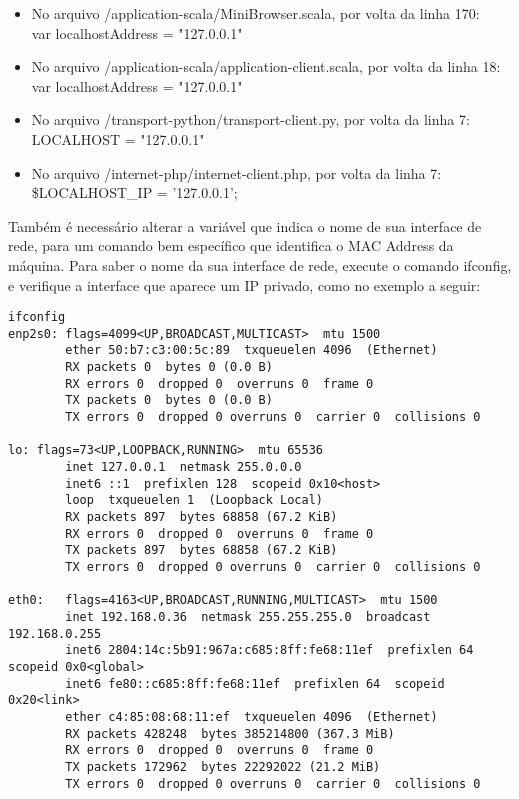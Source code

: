 \documentclass[11pt]{article}
\begin{document}
        \begin{itemize}
            \item No arquivo /application-scala/MiniBrowser.scala, por volta da linha 170: \\ 
                    var localhostAddress = "127.0.0.1"
            \item No arquivo /application-scala/application-client.scala, por volta da linha 18: \\
                    var localhostAddress = "127.0.0.1"
            \item No arquivo /transport-python/transport-client.py, por volta da linha 7: \\
                    LOCALHOST = "127.0.0.1"
            \item No arquivo /internet-php/internet-client.php, por volta da linha 7: \\
                    \$LOCALHOST\_IP = '127.0.0.1';
        \end{itemize}
        
        Também é necessário alterar a variável que indica o nome de sua interface de rede, para um comando bem específico que identifica o MAC Address da máquina. Para saber o nome da sua interface de rede, execute o comando ifconfig, e verifique a interface que aparece um IP privado, como no exemplo a seguir:
        
\begin{lstlisting}
ifconfig
enp2s0: flags=4099<UP,BROADCAST,MULTICAST>  mtu 1500
        ether 50:b7:c3:00:5c:89  txqueuelen 4096  (Ethernet)
        RX packets 0  bytes 0 (0.0 B)
        RX errors 0  dropped 0  overruns 0  frame 0
        TX packets 0  bytes 0 (0.0 B)
        TX errors 0  dropped 0 overruns 0  carrier 0  collisions 0

lo: flags=73<UP,LOOPBACK,RUNNING>  mtu 65536
        inet 127.0.0.1  netmask 255.0.0.0
        inet6 ::1  prefixlen 128  scopeid 0x10<host>
        loop  txqueuelen 1  (Loopback Local)
        RX packets 897  bytes 68858 (67.2 KiB)
        RX errors 0  dropped 0  overruns 0  frame 0
        TX packets 897  bytes 68858 (67.2 KiB)
        TX errors 0  dropped 0 overruns 0  carrier 0  collisions 0

eth0:   flags=4163<UP,BROADCAST,RUNNING,MULTICAST>  mtu 1500
        inet 192.168.0.36  netmask 255.255.255.0  broadcast 192.168.0.255
        inet6 2804:14c:5b91:967a:c685:8ff:fe68:11ef  prefixlen 64  scopeid 0x0<global>
        inet6 fe80::c685:8ff:fe68:11ef  prefixlen 64  scopeid 0x20<link>
        ether c4:85:08:68:11:ef  txqueuelen 4096  (Ethernet)
        RX packets 428248  bytes 385214800 (367.3 MiB)
        RX errors 0  dropped 0  overruns 0  frame 0
        TX packets 172962  bytes 22292022 (21.2 MiB)
        TX errors 0  dropped 0 overruns 0  carrier 0  collisions 0
\end{lstlisting} 
        
\end{document}
